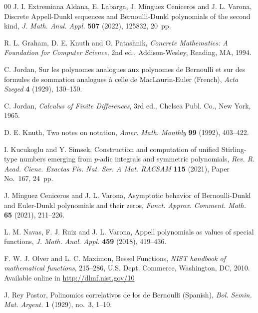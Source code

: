 \documentclass[11pt,a4paper]{article}
\theoremstyle{plain}
\theoremstyle{remark}
\begin{document}
\begin{thebibliography}{00}
J. I. Extremiana Aldana, E. Labarga, J. M\'inguez Ceniceros and J. L. Varona,
{Discrete Appell-Dunkl sequences and Bernoulli-Dunkl polynomials of the second kind},
\textit{J. Math. Anal. Appl.} \textbf{507} (2022), 125832, 20~pp. 

R. L. Graham, D. E. Knuth and O. Patashnik,
\textit{Concrete Mathematics: A Foundation for Computer Science}, 2nd ed.,
Addison-Wesley, Reading, MA, 1994.

C. Jordan,
Sur les polynomes analogues aux polynomes de Bernoulli et sur des formules de sommation analogues \`a celle de MacLaurin-Euler (French),
\textit{Acta Szeged} 
\textbf{4} (1929), 130--150.

C. Jordan,
\textit{Calculus of Finite Differences}, 3rd ed., Chelsea Publ. Co., New York, 1965.

D. E. Knuth, 
Two notes on notation, 
\textit{Amer. Math. Monthly} 
\textbf{99} (1992), 403--422. 

I. Kucukoglu and Y. Simsek,
{Construction and computation of unified Stirling-type numbers emerging from $p$-adic integrals and symmetric polynomials},
\textit{Rev. R. Acad. Cienc. Exactas F\'is. Nat. Ser. A Mat. RACSAM} 
\textbf{115} (2021), Paper No.~167, 24~pp. 

J. M\'inguez Ceniceros and J. L. Varona,
{Asymptotic behavior of Bernoulli-Dunkl and Euler-Dunkl polynomials and their zeros},
\textit{Funct. Approx. Comment. Math.} \textbf{65} (2021), 211--226.

L. M. Navas, F. J. Ruiz and J. L. Varona,
{Appell polynomials as values of special functions},
\textit{J. Math. Anal. Appl.} \textbf{459} (2018), 419--436.

F. W. J. Olver and L. C. Maximon,
Bessel Functions,
\textit{NIST handbook of mathematical functions},
215--286, %
U.S. Dept. Commerce, Washington, DC, 2010.
Available online in \url{http://dlmf.nist.gov/10}

{J. Rey Pastor},
Polinomios correlativos de los de Bernoulli (Spanish),
\textit{Bol. Semin. Mat. Argent.}
\textbf{1} (1929), no.~3, 1--10.


\end{thebibliography}
\end{document}
